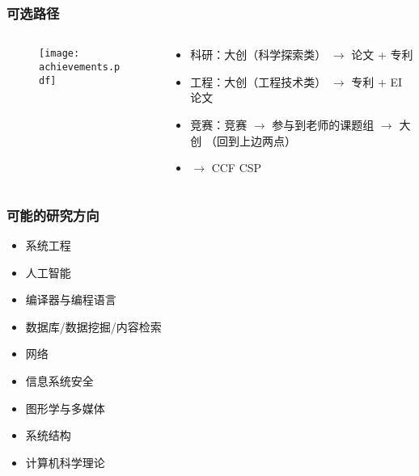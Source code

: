 \begin{frame}
	\frametitle{可选路径}
	\vspace{-2em}
	\begin{columns}
		\begin{column}{0.6\linewidth}
			\begin{figure}
				\centering
				\texttt{[image: achievements.pdf]}
			\end{figure}
		\end{column}
		\begin{column}{0.4\linewidth}
			\begin{itemize}
				\item 科研：大创（科学探索类） $\rightarrow$ 论文 + 专利
				\item 工程：大创（工程技术类） $\rightarrow$ 专利 + EI 论文
				\item 竞赛：竞赛 $\rightarrow$ 参与到老师的课题组 $\rightarrow$ 大创 （回到上边两点）
				\item \phantom{竞赛：} $\rightarrow$ CCF CSP
			\end{itemize}
		\end{column}
	\end{columns}
\end{frame}

\begin{frame}
	\frametitle{可能的研究方向}

	\begin{itemize}
		\item 系统工程
		\item 人工智能
		\item 编译器与编程语言
		\item 数据库/数据挖掘/内容检索
		\item 网络
		\item 信息系统安全
		\item 图形学与多媒体
		\item 系统结构
		\item 计算机科学理论
	\end{itemize}

\end{frame}

